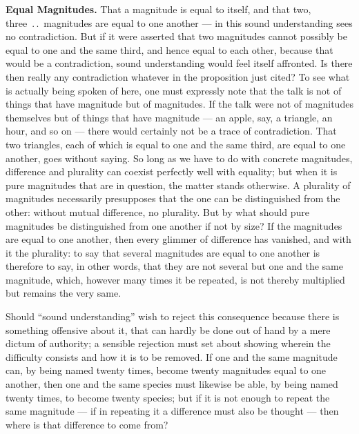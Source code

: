 \documentclass[12pt,a4paper]{book}
\begin{document}
\textbf{Equal Magnitudes.} That a magnitude is equal to itself, and that two,
three~.\,.\ magnitudes are equal to one another --- in this sound
understanding sees no contradiction. But if it were asserted that two
magnitudes cannot possibly be equal to one and the same third, and hence equal
to each other, because that would be a contradiction, sound understanding would
feel itself affronted. Is there then really any contradiction whatever in the
proposition just cited? To see what is actually being spoken of here, one must
expressly note that the talk is not of things that have magnitude but of
magnitudes. If the talk were not of magnitudes themselves but of things that
have magnitude --- an apple, say, a triangle, an hour, and so on --- there
would certainly not be a trace of contradiction. That two triangles, each of
which is equal to one and the same
third, are equal to one another, goes without saying. So long as we have to do
with concrete magnitudes, difference and plurality can coexist perfectly well
with equality; but when it is pure magnitudes that are in question, the matter
stands otherwise. A plurality of magnitudes necessarily presupposes that the
one can be distinguished from the other: without mutual difference, no
plurality. But by what should pure magnitudes be distinguished from one another
if not by size? If the magnitudes are equal to one another, then every glimmer
of difference has vanished, and with it the plurality: to say that several
magnitudes are equal to one another is therefore to say, in other words, that
they are not several but one and the same magnitude, which, however many times
it be repeated, is not thereby multiplied but remains the very same.

Should ``sound understanding'' wish to reject this consequence because there is
something offensive about it, that can hardly be done out of hand by a mere
dictum of authority; a sensible rejection must set about showing wherein the
difficulty consists and how it is to be removed. If one and the same magnitude
can, by being named twenty times, become twenty magnitudes equal to one
another, then one and the same species must likewise be able, by being named
twenty times, to become twenty species; but if it is not enough to repeat the
same magnitude --- if in repeating it a difference must also be thought ---
then where is that difference to come from?
\end{document}
